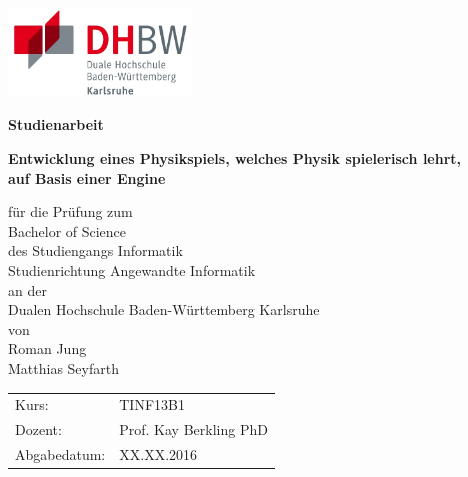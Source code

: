 \begin{titlepage}
\includegraphics[height=2.35cm, left]{res/dhbw-logo.jpg}
	\begin{center}
	\linespread{1.5}
	\vspace{0.5cm}
		{\Large\bfseries{Studienarbeit} \par}
		\vspace{1.5em}
		{\large\bfseries {Entwicklung eines Physikspiels, welches Physik spielerisch lehrt,\\ auf Basis einer Engine} \par}

		\vspace{2.5em}
		
		\normalsize{
			für die Prüfung zum\\
			\vspace{0.5em}
			Bachelor of Science\\
			\vspace{0.5em}
			des Studiengangs Informatik\\
			Studienrichtung Angewandte Informatik\\
			\vspace{0.5em}
			an der\\
			\vspace{0.5em}
			Dualen Hochschule Baden-Württemberg Karlsruhe\\
			\vspace{0.5em}
			von\\
			\vspace{0.5em}
			Roman Jung \\
			Matthias Seyfarth\\
			\vspace{7em}
			
			\begin{tabular}{ll}
					Kurs: & TINF13B1 \\
					Dozent: & Prof. Kay Berkling PhD \\
					Abgabedatum: &  XX.XX.2016\\
			\end{tabular}
		}
		\linespread{1.0}
	\end{center}
\end{titlepage}
\setcounter{page}{2}
\newpage